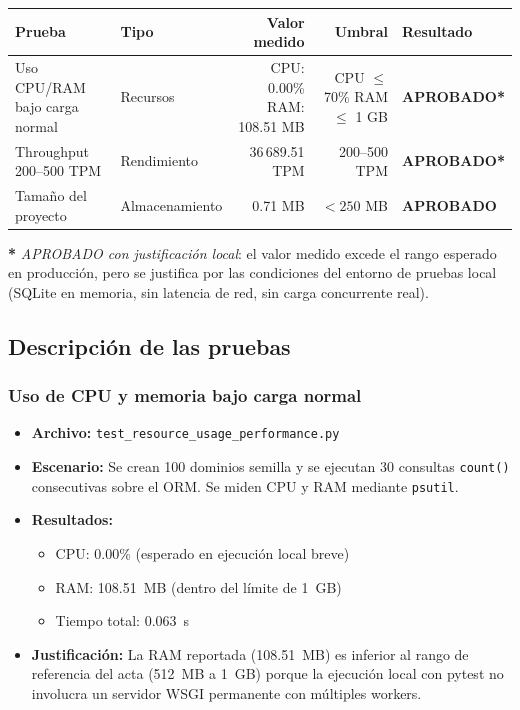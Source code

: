 \documentclass[12pt,a4paper]{article}
\newcommand{\aprobado}{\textcolor{aprobado}{\textbf{APROBADO}}}
\newcommand{\aprobadojust}{\textcolor{aprobadotodo}{\textbf{APROBADO*}}}
\begin{document}
\begin{center}
\begin{tabularx}{\textwidth}{>{\raggedright}p{3cm} >{\raggedright}p{2.5cm} r r >{\centering\arraybackslash}p{2.8cm}}
\toprule
\textbf{Prueba} & \textbf{Tipo} & \textbf{Valor medido} & \textbf{Umbral} & \textbf{Resultado} \\
\midrule
Uso CPU/RAM bajo carga normal
  & Recursos
  & CPU: 0.00\% \newline RAM: 108.51 MB
  & CPU $\leq$ 70\% \newline RAM $\leq$ 1 GB
  & \aprobadojust \\
Throughput 200--500 TPM
  & Rendimiento
  & 36\,689.51 TPM
  & 200--500 TPM
  & \aprobadojust \\
Tamaño del proyecto
  & Almacenamiento
  & 0.71 MB
  & $< 250$ MB
  & \aprobado \\
\bottomrule
\end{tabularx}
\end{center}

\smallskip
{\footnotesize\textbf{*} \textit{APROBADO con justificación local}: el valor medido excede el rango
esperado en producción, pero se justifica por las condiciones del entorno de pruebas local
(SQLite en memoria, sin latencia de red, sin carga concurrente real).}

\subsection{Descripción de las pruebas}

\subsubsection{Uso de CPU y memoria bajo carga normal}

\begin{itemize}
  \item \textbf{Archivo:} \texttt{test\_resource\_usage\_performance.py}
  \item \textbf{Escenario:} Se crean 100 dominios semilla y se ejecutan 30 consultas
        \texttt{count()} consecutivas sobre el ORM. Se miden CPU y RAM mediante \texttt{psutil}.
  \item \textbf{Resultados:}
        \begin{itemize}
          \item CPU: 0.00\% (esperado en ejecución local breve)
          \item RAM: 108.51~MB (dentro del límite de 1~GB)
          \item Tiempo total: 0.063~s
        \end{itemize}
  \item \textbf{Justificación:} La RAM reportada (108.51~MB) es inferior al rango de referencia
        del acta (512~MB a 1~GB) porque la ejecución local con pytest no involucra un servidor
        WSGI permanente con múltiples workers.
\end{itemize}
\end{document}
